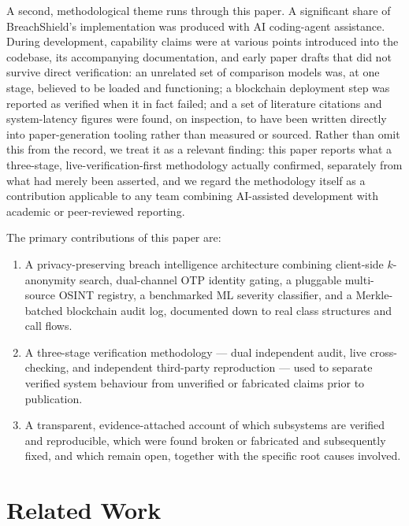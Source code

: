 \documentclass[conference]{IEEEtran}
\begin{document}
A second, methodological theme runs through this paper. A significant share of BreachShield's implementation was produced with AI coding-agent assistance. During development, capability claims were at various points introduced into the codebase, its accompanying documentation, and early paper drafts that did not survive direct verification: an unrelated set of comparison models was, at one stage, believed to be loaded and functioning; a blockchain deployment step was reported as verified when it in fact failed; and a set of literature citations and system-latency figures were found, on inspection, to have been written directly into paper-generation tooling rather than measured or sourced. Rather than omit this from the record, we treat it as a relevant finding: this paper reports what a three-stage, live-verification-first methodology actually confirmed, separately from what had merely been asserted, and we regard the methodology itself as a contribution applicable to any team combining AI-assisted development with academic or peer-reviewed reporting.

The primary contributions of this paper are:
\begin{enumerate}
    \item A privacy-preserving breach intelligence architecture combining client-side $k$-anonymity search, dual-channel OTP identity gating, a pluggable multi-source OSINT registry, a benchmarked ML severity classifier, and a Merkle-batched blockchain audit log, documented down to real class structures and call flows.
    \item A three-stage verification methodology --- dual independent audit, live cross-checking, and independent third-party reproduction --- used to separate verified system behaviour from unverified or fabricated claims prior to publication.
    \item A transparent, evidence-attached account of which subsystems are verified and reproducible, which were found broken or fabricated and subsequently fixed, and which remain open, together with the specific root causes involved.
\end{enumerate}

\section{Related Work}
\end{document}
